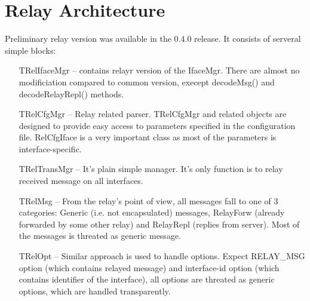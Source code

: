 \section{Relay Architecture}
Preliminary relay version was available in the 0.4.0 release. It
consists of serveral simple blocks:
\begin{itemize}
\item[TRelIfaceMgr] -- contains relayr version of the IfaceMgr. There
  are almost no modificiation compared to common version, execept
  decodeMsg() and decodeRelayRepl() methods.
\item[TRelCfgMgr] -- Relay related parser. TRelCfgMgr and related
  objects are designed to provide easy access to parameters specified
  in the configuration file. RelCfgIface is a very important class as
  most of the parameters is interface-specific.
\item[TRelTransMgr] -- It's plain simple manager. It's only function
  is to relay received message on all interfaces.
\item[TRelMsg] -- From the relay's point of view, all messages fall to
  one of 3 categories: Generic (i.e. not encapsulated) messages,
  RelayForw (already forwarded by some other relay) and RelayRepl
  (replies from server). Most of the messages is threated as generic
  message.
\item[TRelOpt] -- Similar approach is used to handle options. Expect
  RELAY\_MSG option (which contains relayed message) and interface-id
  option (which contains identifier of the interface), all options are
  threated as generic options, which are handled transparently.
\end{itemize}
